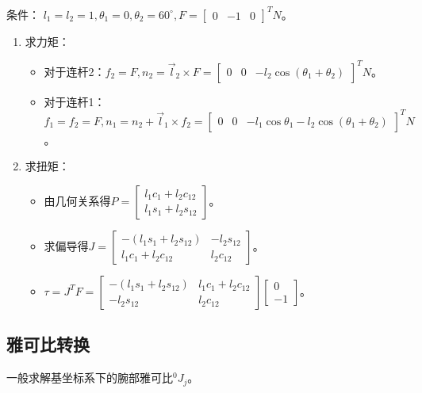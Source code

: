 \documentclass[
12pt, %
a4paper, 
oneside, %
headinclude,footinclude, %
]{scrartcl}
\begin{document}
{\footnotesize
条件： $ l_1 = l_2 = 1, \theta_1 = 0, \theta_2 = 60^\circ, F = \begin{bmatrix} 0 & -1 & 0 \end{bmatrix}^T N $。
\begin{enumerate}
\item 求力矩：
\begin{itemize}
\item 对于连杆2：$ f_2 = F, n_2 = \vec{l}_2 \times F = \begin{bmatrix} 0 & 0 & -l_2 \cos(\theta_1 + \theta_2) \end{bmatrix}^T N $。
\item 对于连杆1：$ f_1 = f_2 = F, n_1 = n_2 + \vec{l}_1 \times f_2 = \begin{bmatrix} 0 & 0 & -l_1 \cos\theta_1 - l_2 \cos(\theta_1 + \theta_2) \end{bmatrix}^T N $。
\end{itemize} 
\item 求扭矩：
\begin{itemize}
\item 由几何关系得$ P = \begin{bmatrix} l_1 c_1 + l_2 c_{12} \\ l_1 s_1 + l_2 s_{12} \end{bmatrix} $。
\item 求偏导得$ J = \begin{bmatrix} -(l_1 s_1 + l_2 s_{12}) & -l_2 s_{12} \\ l_1 c_1 + l_2 c_{12} & l_2 c_{12} \end{bmatrix} $。
\item $ \tau = J^T F = \begin{bmatrix} -(l_1 s_1 + l_2 s_{12}) & l_1 c_1 + l_2 c_{12} \\ - l_2 s_{12} & l_2 c_{12} \end{bmatrix} \begin{bmatrix} 0 \\ -1 \end{bmatrix} $。
\end{itemize} 
\end{enumerate}
}
\subsection[雅可比转换]{雅可比转换}\label{sec:Jacobian transform}\label{sec:bingxing_back1}
一般求解基坐标系下的腕部雅可比$ ^0 J_j $。
\end{document}
